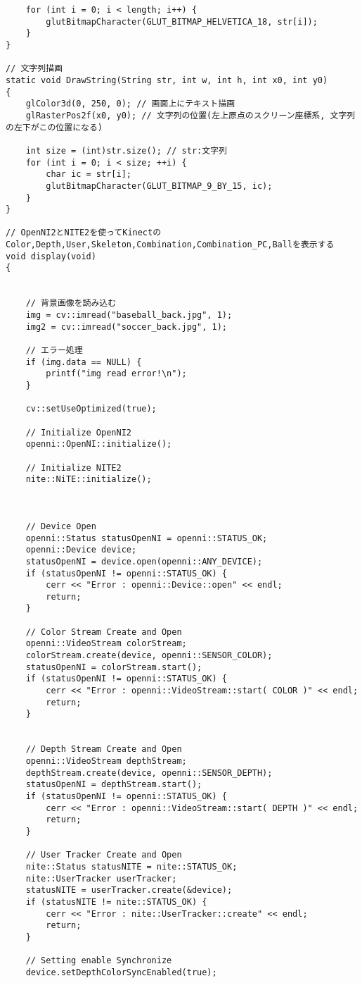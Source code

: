 \begin{lstlisting}
	for (int i = 0; i < length; i++) {
		glutBitmapCharacter(GLUT_BITMAP_HELVETICA_18, str[i]);
	}
}

// 文字列描画
static void DrawString(String str, int w, int h, int x0, int y0)
{
	glColor3d(0, 250, 0); // 画面上にテキスト描画
	glRasterPos2f(x0, y0); // 文字列の位置(左上原点のスクリーン座標系, 文字列の左下がこの位置になる)

	int size = (int)str.size(); // str:文字列
	for (int i = 0; i < size; ++i) {
		char ic = str[i];
		glutBitmapCharacter(GLUT_BITMAP_9_BY_15, ic);
	}
}

// OpenNI2とNITE2を使ってKinectのColor,Depth,User,Skeleton,Combination,Combination_PC,Ballを表示する
void display(void)
{


	// 背景画像を読み込む
	img = cv::imread("baseball_back.jpg", 1);
	img2 = cv::imread("soccer_back.jpg", 1);

	// エラー処理
	if (img.data == NULL) {
		printf("img read error!\n");
	}

	cv::setUseOptimized(true);

	// Initialize OpenNI2
	openni::OpenNI::initialize();

	// Initialize NITE2 
	nite::NiTE::initialize();



	// Device Open
	openni::Status statusOpenNI = openni::STATUS_OK;
	openni::Device device;
	statusOpenNI = device.open(openni::ANY_DEVICE);
	if (statusOpenNI != openni::STATUS_OK) {
		cerr << "Error : openni::Device::open" << endl;
		return;
	}

	// Color Stream Create and Open
	openni::VideoStream colorStream;
	colorStream.create(device, openni::SENSOR_COLOR);
	statusOpenNI = colorStream.start();
	if (statusOpenNI != openni::STATUS_OK) {
		cerr << "Error : openni::VideoStream::start( COLOR )" << endl;
		return;
	}


	// Depth Stream Create and Open
	openni::VideoStream depthStream;
	depthStream.create(device, openni::SENSOR_DEPTH);
	statusOpenNI = depthStream.start();
	if (statusOpenNI != openni::STATUS_OK) {
		cerr << "Error : openni::VideoStream::start( DEPTH )" << endl;
		return;
	}

	// User Tracker Create and Open
	nite::Status statusNITE = nite::STATUS_OK;
	nite::UserTracker userTracker;
	statusNITE = userTracker.create(&device);
	if (statusNITE != nite::STATUS_OK) {
		cerr << "Error : nite::UserTracker::create" << endl;
		return;
	}

	// Setting enable Synchronize
	device.setDepthColorSyncEnabled(true);


\end{lstlisting}
